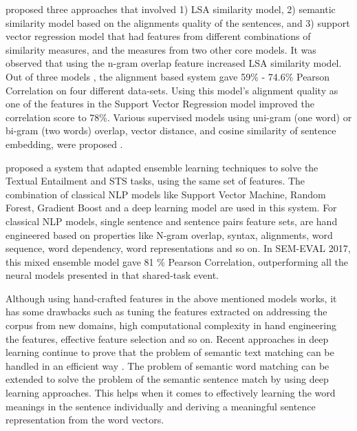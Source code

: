 \documentclass[12pt]{report} %
\begin{document}
\cite{han2013umbc_ebiquity} proposed three approaches that involved 1) LSA similarity model, 2) semantic similarity model based on the alignments quality of the sentences, and 3) support vector regression model that had features from different combinations of similarity measures, and the measures from two other core models. It was observed that using the n-gram overlap feature increased LSA similarity model. Out of three models \citep{han2013umbc_ebiquity}, the alignment based system gave 59\% - 74.6\% Pearson Correlation on four different data-sets. Using this model's alignment quality as one of the features in the Support Vector Regression model improved the correlation score to 78\%.  Various supervised models using uni-gram (one word) or bi-gram (two words) overlap, vector distance, and cosine similarity of sentence embedding, were proposed \citep{agirre2015semeval}.   

\cite{tian2017ecnu} proposed a system that adapted ensemble learning techniques to solve the Textual Entailment and STS tasks, using the same set of features. The combination of classical NLP models like Support Vector Machine, Random Forest, Gradient Boost and a deep learning model are used in this system. For classical NLP models, single sentence and sentence pairs feature sets, are hand engineered based on properties like N-gram overlap, syntax, alignments, word sequence, word dependency, word representations and so on. In SEM-EVAL 2017, this mixed ensemble model gave 81 \% Pearson Correlation, outperforming all the neural models presented in that shared-task event.

Although using hand-crafted features in the above mentioned models works, it has some drawbacks such as tuning the features extracted on addressing the corpus from new domains, high computational complexity in hand engineering the features, effective feature selection and so on. Recent approaches in deep learning continue to prove that the problem of semantic text matching can be handled in an efficient way \citep{cer2017semeval}. The problem of semantic word matching can be extended to solve the problem of the semantic sentence match by using deep learning approaches. This helps when it comes to effectively learning the word meanings in the sentence individually and deriving a meaningful sentence representation from the word vectors. 
\end{document}
